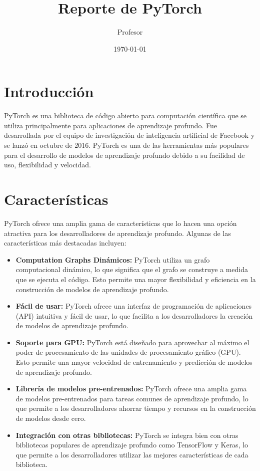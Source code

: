 \documentclass{article}
\title{Reporte de PyTorch}
\author{Profesor}
\date{\today}
\begin{document}
\maketitle

\section{Introducción}
PyTorch es una biblioteca de código abierto para computación científica que se utiliza principalmente para aplicaciones de aprendizaje profundo. Fue desarrollada por el equipo de investigación de inteligencia artificial de Facebook y se lanzó en octubre de 2016. PyTorch es una de las herramientas más populares para el desarrollo de modelos de aprendizaje profundo debido a su facilidad de uso, flexibilidad y velocidad.

\section{Características}
PyTorch ofrece una amplia gama de características que lo hacen una opción atractiva para los desarrolladores de aprendizaje profundo. Algunas de las características más destacadas incluyen:

\begin{itemize}
    \item \textbf{Computation Graphs Dinámicos:} PyTorch utiliza un grafo computacional dinámico, lo que significa que el grafo se construye a medida que se ejecuta el código. Esto permite una mayor flexibilidad y eficiencia en la construcción de modelos de aprendizaje profundo.
    \item \textbf{Fácil de usar:} PyTorch ofrece una interfaz de programación de aplicaciones (API) intuitiva y fácil de usar, lo que facilita a los desarrolladores la creación de modelos de aprendizaje profundo.
    \item \textbf{Soporte para GPU:} PyTorch está diseñado para aprovechar al máximo el poder de procesamiento de las unidades de procesamiento gráfico (GPU). Esto permite una mayor velocidad de entrenamiento y predicción de modelos de aprendizaje profundo.
    \item \textbf{Librería de modelos pre-entrenados:} PyTorch ofrece una amplia gama de modelos pre-entrenados para tareas comunes de aprendizaje profundo, lo que permite a los desarrolladores ahorrar tiempo y recursos en la construcción de modelos desde cero.
    \item \textbf{Integración con otras bibliotecas:} PyTorch se integra bien con otras bibliotecas populares de aprendizaje profundo como TensorFlow y Keras, lo que permite a los desarrolladores utilizar las mejores características de cada biblioteca.
\end{itemize}
\end{document}
